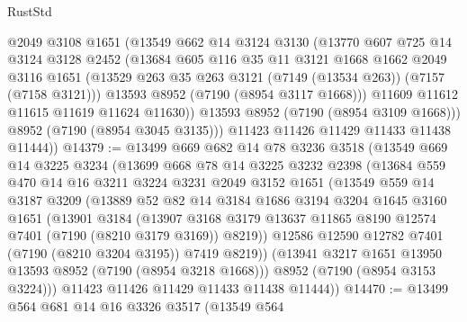 \begin{lexlean}{RustStd}
\begin{coremodule}
            @2049
            @3108
            @1651
            (@13549
              @662
              @14
              @3124
              @3130
              (@13770
                @607
                @725
                @14
                @3124
                @3128
                @2452
                (@13684
                  @605
                  @116
                  @35
                  @11
                  @3121
                  @1668
                  @1662
                  @2049
                  @3116
                  @1651
                  (@13529 @263 @35 @263 @3121 (@7149 (@13534 @263)) (@7157 (@7158 @3121)))
                  @13593
                  @8952
                  (@7190 (@8954 @3117 @1668)))
                @11609
                @11612
                @11615
                @11619
                @11624
                @11630))
            @13593
            @8952
            (@7190 (@8954 @3109 @1668)))
          @8952
          (@7190 (@8954 @3045 @3135)))
        @11423
        @11426
        @11429
        @11433
        @11438
        @11444))
@14379 := @13499
    @669
    @682
    @14
    @78
    @3236
    @3518
    (@13549
      @669
      @14
      @3225
      @3234
      (@13699
        @668
        @78
        @14
        @3225
        @3232
        @2398
        (@13684
          @559
          @470
          @14
          @16
          @3211
          @3224
          @3231
          @2049
          @3152
          @1651
          (@13549
            @559
            @14
            @3187
            @3209
            (@13889
              @52
              @82
              @14
              @3184
              @1686
              @3194
              @3204
              @1645
              @3160
              @1651
              (@13901
                @3184
                (@13907
                  @3168
                  @3179
                  @13637
                  @11865
                  @8190
                  @12574
                  @7401
                  (@7190 (@8210 @3179 @3169))
                  @8219))
              @12586
              @12590
              @12782
              @7401
              (@7190 (@8210 @3204 @3195))
              @7419
              @8219))
          (@13941 @3217 @1651 @13950 @13593 @8952 (@7190 (@8954 @3218 @1668)))
          @8952
          (@7190 (@8954 @3153 @3224)))
        @11423
        @11426
        @11429
        @11433
        @11438
        @11444))
@14470 := @13499
    @564
    @681
    @14
    @16
    @3326
    @3517
    (@13549
      @564

\end{coremodule}
\end{lexlean}
